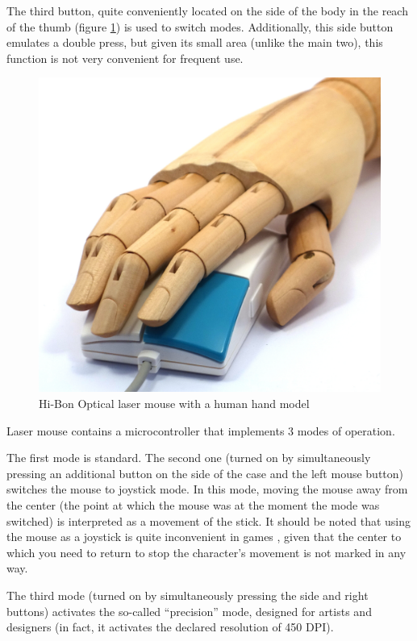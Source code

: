 \documentclass[11pt, a4paper]{article}
\begin{document}
The third button, quite conveniently located on the side of the body in the reach of the thumb (figure \ref{fig:OpticalLaserMouseHand}) is used to switch modes. Additionally, this side button emulates a double press, but given its small area (unlike the main two), this function is not very convenient for frequent use.

\begin{figure}[h]
    \centering
    \includegraphics[scale=0.3]{1996_hi-bon_laser_mouse/hand_60.jpg}
    \caption{Hi-Bon Optical laser mouse with a human hand model}
    \label{fig:OpticalLaserMouseHand}
\end{figure}

Laser mouse contains a microcontroller that implements 3 modes of operation.

The first mode is standard. The second one (turned on by simultaneously pressing an additional button on the side of the case and the left mouse button) switches the mouse to joystick mode. In this mode, moving the mouse away from the center (the point at which the mouse was at the moment the mode was switched) is interpreted as a movement of the stick. It should be noted that using the mouse as a joystick is quite inconvenient in games \cite{LittleMagick}, given that the center to which you need to return to stop the character's movement is not marked in any way.

The third mode (turned on by simultaneously pressing the side and right buttons) activates the so-called “precision” mode, designed for artists and designers (in fact, it activates the declared resolution of 450 DPI).
\end{document}
